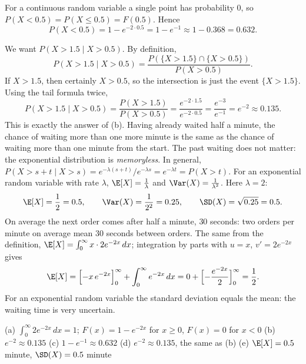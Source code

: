 \begin{solution}
	 For a continuous random variable a single point has
	probability 0, so $P(X<0.5)=P(X\le0.5)=F(0.5)$. Hence
	\[ P(X<0.5)=1-e^{-2\cdot0.5}=1-e^{-1}\approx1-0.368=0.632. \]

	 We want $P(X>1.5\mid X>0.5)$. By definition,
	\[ P(X>1.5\mid X>0.5)=\frac{P(\{X>1.5\}\cap\{X>0.5\})}{P(X>0.5)}. \]
	If $X>1.5$, then certainly $X>0.5$, so the intersection is just the event
	$\{X>1.5\}$. Using the tail formula twice,
	\[ P(X>1.5\mid X>0.5)=\frac{P(X>1.5)}{P(X>0.5)}
		=\frac{e^{-2\cdot1.5}}{e^{-2\cdot0.5}}=\frac{e^{-3}}{e^{-1}}
		=e^{-2}\approx0.135. \]
	This is exactly the answer of (b). Having already waited half a minute,
	the chance of waiting more than one more minute is the same as the chance
	of waiting more than one minute from the start. The past waiting does not
	matter: the exponential distribution is \emph{memoryless}. In general,
	$P(X>s+t\mid X>s)=e^{-\lambda(s+t)}/e^{-\lambda s}=e^{-\lambda t}=P(X>t)$.
	 For an exponential random variable with rate $\lambda$,
	$\E[X]=\frac1\lambda$ and $\Var(X)=\frac1{\lambda^2}$. Here $\lambda=2$:
	\[ \E[X]=\frac12=0.5,\qquad \Var(X)=\frac1{2^2}=0.25,\qquad
		\SD(X)=\sqrt{0.25}=0.5. \]
	On average the next order comes after half a minute, $30$ seconds: two
	orders per minute on average mean $30$ seconds between orders. The same
	from the definition, $\E[X]=\int_0^\infty x\cdot2e^{-2x}\,dx$; integration
	by parts with $u=x$, $v'=2e^{-2x}$ gives
	\[ \E[X]=\Bigl[-x\,e^{-2x}\Bigr]_0^\infty+\int_0^\infty e^{-2x}\,dx
		=0+\Bigl[-\frac{e^{-2x}}{2}\Bigr]_0^\infty=\frac12. \]
	For an exponential random variable the standard deviation equals the
	mean: the waiting time is very uncertain.
	\begin{answer}
		(a) $\int_0^\infty 2e^{-2x}\,dx=1$; $F(x)=1-e^{-2x}$ for $x\ge0$,
		$F(x)=0$ for $x<0$
		\quad (b) $e^{-2}\approx0.135$
		\quad (c) $1-e^{-1}\approx0.632$
		\quad (d) $e^{-2}\approx0.135$, the same as (b)
		\quad (e) $\E[X]=0.5$ minute, $\SD(X)=0.5$ minute
	\end{answer}
\end{solution}
